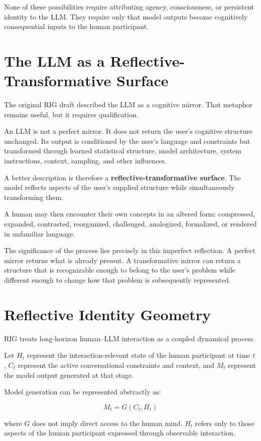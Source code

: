 \documentclass[12pt]{article}
\begin{document}
None of these possibilities require attributing agency, consciousness, or persistent identity to the LLM. They require only that model outputs become cognitively consequential inputs to the human participant.

\section{The LLM as a Reflective-Transformative Surface}

The original RIG draft described the LLM as a cognitive mirror. That metaphor remains useful, but it requires qualification.

An LLM is not a perfect mirror. It does not return the user's cognitive structure unchanged. Its output is conditioned by the user's language and constraints but transformed through learned statistical structure, model architecture, system instructions, context, sampling, and other influences.

A better description is therefore a \textbf{reflective-transformative surface}. The model reflects aspects of the user's supplied structure while simultaneously transforming them.

A human may then encounter their own concepts in an altered form: compressed, expanded, contrasted, reorganized, challenged, analogized, formalized, or rendered in unfamiliar language.

The significance of the process lies precisely in this imperfect reflection. A perfect mirror returns what is already present. A transformative mirror can return a structure that is recognizable enough to belong to the user's problem while different enough to change how that problem is subsequently represented.

\section{Reflective Identity Geometry}

RIG treats long-horizon human--LLM interaction as a coupled dynamical process.

Let $H_t$ represent the interaction-relevant state of the human participant at time $t$, $C_t$ represent the active conversational constraints and context, and $M_t$ represent the model output generated at that stage.

Model generation can be represented abstractly as:

\[
M_t = G(C_t, H_t)
\]

where $G$ does not imply direct access to the human mind. $H_t$ refers only to those aspects of the human participant expressed through observable interaction.
\end{document}
